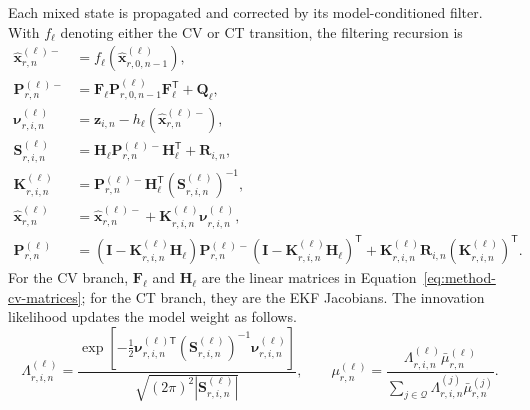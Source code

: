 Each mixed state is propagated and corrected by its model-conditioned filter.
With \(f_{\ell}\) denoting either the CV or CT transition, the filtering
recursion is
\begin{align}
    \widehat{\mathbf{x}}^{(\ell)-}_{r,n}
    &=f_{\ell}\!\left(\widehat{\mathbf{x}}^{(\ell)}_{r,0,n-1}\right),
    \label{eq:method-imm-prediction}\\
    \mathbf{P}^{(\ell)-}_{r,n}
    &=\mathbf{F}_{\ell}\mathbf{P}^{(\ell)}_{r,0,n-1}
    \mathbf{F}_{\ell}^{\mathsf T}+\mathbf{Q}_{\ell},\\
    \boldsymbol{\nu}^{(\ell)}_{r,i,n}
    &=\mathbf{z}_{i,n}-h_{\ell}\!\left(\widehat{\mathbf{x}}^{(\ell)-}_{r,n}\right),
    \label{eq:method-imm-innovation}\\
    \mathbf{S}^{(\ell)}_{r,i,n}
    &=\mathbf{H}_{\ell}\mathbf{P}^{(\ell)-}_{r,n}
    \mathbf{H}_{\ell}^{\mathsf T}+\mathbf{R}_{i,n},\\
    \mathbf{K}^{(\ell)}_{r,i,n}
    &=\mathbf{P}^{(\ell)-}_{r,n}\mathbf{H}_{\ell}^{\mathsf T}
    \left(\mathbf{S}^{(\ell)}_{r,i,n}\right)^{-1},\\
    \widehat{\mathbf{x}}^{(\ell)}_{r,n}
    &=\widehat{\mathbf{x}}^{(\ell)-}_{r,n}
    +\mathbf{K}^{(\ell)}_{r,i,n}\boldsymbol{\nu}^{(\ell)}_{r,i,n},
    \label{eq:method-imm-state-update}\\
    \mathbf{P}^{(\ell)}_{r,n}
    &=(\mathbf{I}-\mathbf{K}^{(\ell)}_{r,i,n}\mathbf{H}_{\ell})
    \mathbf{P}^{(\ell)-}_{r,n}
    (\mathbf{I}-\mathbf{K}^{(\ell)}_{r,i,n}\mathbf{H}_{\ell})^{\mathsf T}
    +\mathbf{K}^{(\ell)}_{r,i,n}\mathbf{R}_{i,n}
    \left(\mathbf{K}^{(\ell)}_{r,i,n}\right)^{\mathsf T}.
    \label{eq:method-imm-covariance-update}
\end{align}
For the CV branch, \(\mathbf{F}_{\ell}\) and \(\mathbf{H}_{\ell}\) are the
linear matrices in Equation~\eqref{eq:method-cv-matrices}; for the CT branch,
they are the EKF Jacobians.  The innovation likelihood updates the model weight as follows.
\begin{equation}
    \Lambda^{(\ell)}_{r,i,n}
    =
    \frac{\exp\!\left[-\tfrac{1}{2}
    \boldsymbol{\nu}^{(\ell)\mathsf T}_{r,i,n}
    \left(\mathbf{S}^{(\ell)}_{r,i,n}\right)^{-1}
    \boldsymbol{\nu}^{(\ell)}_{r,i,n}\right]}
    {\sqrt{(2\pi)^2\left|\mathbf{S}^{(\ell)}_{r,i,n}\right|}},
    \qquad
    \mu^{(\ell)}_{r,n}
    =
    \frac{\Lambda^{(\ell)}_{r,i,n}\bar{\mu}^{(\ell)}_{r,n}}
    {\sum_{j\in\mathcal{Q}}
    \Lambda^{(j)}_{r,i,n}\bar{\mu}^{(j)}_{r,n}}.
    \label{eq:method-imm-mode-update}
\end{equation}
